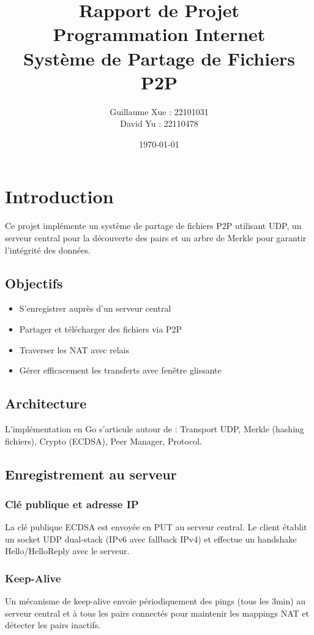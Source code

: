 \documentclass[11pt,a4paper]{report}
\title{Rapport de Projet\\Programmation Internet\\Système de Partage de Fichiers P2P}
\author{Guillaume Xue : 22101031 \\ David Yu : 22110478}
\date{\today}
\begin{document}
\maketitle

\chapter{Introduction}

Ce projet implémente un système de partage de fichiers P2P utilisant UDP, un serveur central pour la découverte des pairs et un arbre de Merkle pour garantir l'intégrité des données.

\section{Objectifs}

\begin{itemize}
    \item S'enregistrer auprès d'un serveur central
    \item Partager et télécharger des fichiers via P2P
    \item Traverser les NAT avec relais
    \item Gérer efficacement les transferts avec fenêtre glissante
\end{itemize}

\section{Architecture}

L'implémentation en Go s'articule autour de : Transport UDP, Merkle (hashing fichiers), Crypto (ECDSA), Peer Manager, Protocol.

\section{Enregistrement au serveur}

\subsection{Clé publique et adresse IP}
La clé publique ECDSA est envoyée en PUT au serveur central. Le client établit un socket UDP dual-stack (IPv6 avec fallback IPv4) et effectue un handshake Hello/HelloReply avec le serveur.

\subsection{Keep-Alive}
Un mécanisme de keep-alive envoie périodiquement des pings (tous les 3min) au serveur central et à tous les pairs connectés pour maintenir les mappings NAT et détecter les pairs inactifs.
\end{document}
